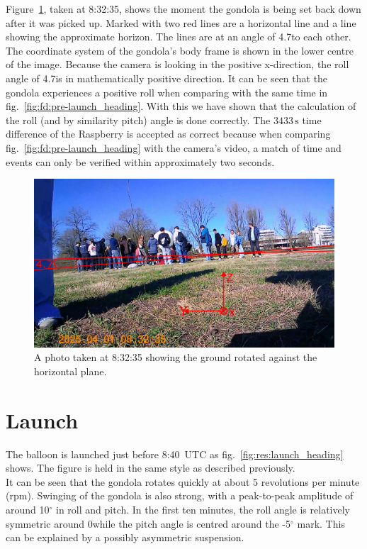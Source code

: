 Figure~\ref{fig:fd:apeman_roll}, taken at 8:32:35, shows the moment the gondola is being set back down after it was picked up. Marked with two red lines are a horizontal line and a line showing the approximate horizon. The lines are at an angle of 4.7\deg to each other. The coordinate system of the gondola's body frame is shown in the lower centre of the image. Because the camera is looking in the positive x-direction, the roll angle of 4.7\deg is in mathematically positive direction. It can be seen that the gondola experiences a positive roll when comparing with the same time in fig.~\ref{fig:fd:pre-launch_heading}. With this we have shown that the calculation of the roll (and by similarity pitch) angle is done correctly. The $3433\,\mathrm{s}$ time difference of the Raspberry is accepted as correct because when comparing fig.~\ref{fig:fd:pre-launch_heading} with the camera's video, a match of time and events can only be verified within approximately two seconds.

\begin{figure}[h]
    \centering
    \includegraphics[width=0.8\linewidth]{images/05_flight_data/apeman_roll_8_32_35.png}
    \caption{A photo taken at 8:32:35 showing the ground rotated against the horizontal plane.}
    \label{fig:fd:apeman_roll}
\end{figure}

\section{Launch \label{sec:launch}}
The balloon is launched just before 8:40~UTC as fig.~\ref{fig:res:launch_heading} shows. The figure is held in the same style as described previously.\\
It can be seen that the gondola rotates quickly at about 5 revolutions per minute (rpm). Swinging of the gondola is also strong, with a peak-to-peak amplitude of around 10$^\circ$ in roll and pitch. In the first ten minutes, the roll angle is relatively symmetric around 0\deg while the pitch angle is centred around the -5$^\circ$ mark. This can be explained by a possibly asymmetric suspension.

